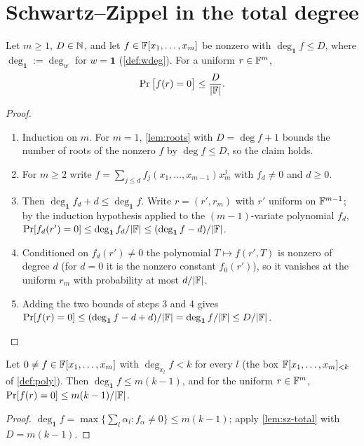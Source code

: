 \section{Schwartz--Zippel in the total degree}

\begin{lemma}\label{lem:sz-total}
Let $m\ge1$, $D\in\mathbb{N}$, and let $f\in\mathbb{F}[x_1,\dots,x_m]$ be nonzero with
$\deg_{\mathbf 1}f\le D$, where $\deg_{\mathbf 1}:=\deg_w$ for $w=\mathbf 1$ (\cref{def:wdeg}). For a
uniform $r\in\mathbb{F}^m$,
\[
\Pr\big[f(r)=0\big]\le\frac{D}{|\mathbb{F}|}.
\]
\end{lemma}

\begin{proof}\begin{enumerate}
\item Induction on $m$. For $m=1$, \cref{lem:roots} with $D=\deg f+1$ bounds the number of
roots of the nonzero $f$ by $\deg f\le D$, so the claim holds.
\item For $m\ge2$ write $f=\sum_{j\le d}f_j(x_1,\dots,x_{m-1})x_m^j$ with $f_d\ne0$ and $d\ge0$.
\item Then $\deg_{\mathbf 1}f_d+d\le\deg_{\mathbf 1}f$. Write $r=(r',r_m)$ with $r'$ uniform on $\mathbb{F}^{m-1}$; by the induction hypothesis applied to the $(m-1)$-variate polynomial $f_d$, $\Pr[f_d(r')=0]\le\deg_{\mathbf 1}f_d/|\mathbb{F}|\le(\deg_{\mathbf 1}f-d)/|\mathbb{F}|$.
\item Conditioned on $f_d(r')\ne0$ the polynomial $T\mapsto f(r',T)$ is nonzero of degree $d$ (for $d=0$ it is the nonzero constant $f_0(r')$), so it vanishes at the uniform $r_m$ with probability at most $d/|\mathbb{F}|$.
\item Adding the two bounds of steps 3 and 4 gives $\Pr[f(r)=0]\le(\deg_{\mathbf 1}f-d+d)/|\mathbb{F}|=\deg_{\mathbf 1}f/|\mathbb{F}|\le D/|\mathbb{F}|$.
\end{enumerate}\end{proof}

\begin{corollary}\label{cor:box}
Let $0\ne f\in\mathbb{F}[x_1,\dots,x_m]$ with $\deg_{x_l}f<k$ for every $l$ (the box
$\mathbb{F}[x_1,\dots,x_m]_{<k}$ of \cref{def:poly}). Then $\deg_{\mathbf 1}f\le m(k-1)$, and for the
uniform $r\in\mathbb{F}^m$, $\Pr[f(r)=0]\le m(k-1)/|\mathbb{F}|$.
\end{corollary}

\begin{proof}
$\deg_{\mathbf 1}f=\max\{\sum_l\alpha_l:f_\alpha\ne0\}\le m(k-1)$; apply \cref{lem:sz-total} with
$D=m(k-1)$.
\end{proof}

